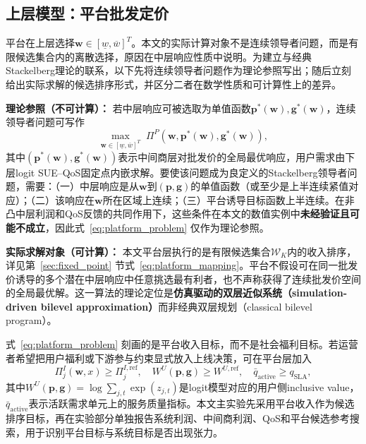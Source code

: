 \documentclass[UTF8,11pt]{ctexart}
\newcommand{\w}{\boldsymbol{w}}
\newcommand{\p}{\boldsymbol{p}}
\newcommand{\g}{\boldsymbol{g}}
\begin{document}
\subsection{上层模型：平台批发定价}
\label{sec:upper_platform}

平台在上层选择$\w\in[\underline w,\overline w]^T$。本文的实际计算对象不是连续领导者问题，而是有限候选集合内的离散选择，原因在中层响应性质中说明。为建立与经典Stackelberg理论的联系，以下先将连续领导者问题作为理论参照写出；随后立刻给出实际求解的候选排序形式，并区分二者在数学性质和可计算性上的差异。

\textbf{理论参照（不可计算）：} 若中层响应可被选取为单值函数$\p^*(\w),\g^*(\w)$，连续领导者问题可写作
\begin{equation}
  \max_{\w\in[\underline w,\overline w]^T}\;
  \Pi^P(\w,\p^*(\w),\g^*(\w)),
  \label{eq:platform_problem}
\end{equation}
其中$(\p^*(\w),\g^*(\w))$表示中间商层对批发价的全局最优响应，用户需求由下层logit SUE--QoS固定点内嵌求解。要使该问题成为良定义的Stackelberg领导者问题，需要：（一）中层响应是从$\w$到$(\p,\g)$的单值函数（或至少是上半连续紧值对应）；（二）该响应在$\w$所在区域上连续；（三）平台诱导目标函数上半连续。在非凸中层利润和QoS反馈的共同作用下，这些条件在本文的数值实例中\textbf{未经验证且可能不成立}，因此式~\eqref{eq:platform_problem} 仅作为理论参照。

\textbf{实际求解对象（可计算）：} 本文平台层执行的是有限候选集合$\mathcal{W}_K$内的收入排序，详见第~\ref{sec:fixed_point} 节式~\eqref{eq:platform_mapping}。平台不假设可在同一批发价诱导的多个潜在中层响应中任意挑选最有利者，也不声称获得了连续批发价空间的全局最优解。这一算法的理论定位是\textbf{仿真驱动的双层近似系统（simulation-driven bilevel approximation）}而非经典双层规划（classical bilevel program）。

式~\eqref{eq:platform_problem} 刻画的是平台收入目标，而不是社会福利目标。若运营者希望把用户福利或下游参与约束显式放入上线决策，可在平台层加入
\begin{equation}
  \Pi^I_j(\w,x)\ge \Pi^{I,\mathrm{ref}}_j,\quad
  W^U(\p,\g)\ge W^{U,\mathrm{ref}},\quad
  \bar q_{\mathrm{active}}\ge q_{\mathrm{SLA}},
  \label{eq:deployment_constraints}
\end{equation}
其中$W^U(\p,\g)=\log\sum_{j,t}\exp(z_{j,t})$是logit模型对应的用户侧inclusive value，$\bar q_{\mathrm{active}}$表示活跃需求单元上的服务质量指标。本文主实验先采用平台收入作为候选排序目标，再在实验部分单独报告系统利润、中间商利润、QoS和平台候选参考搜索，用于识别平台目标与系统目标是否出现张力。
\end{document}
